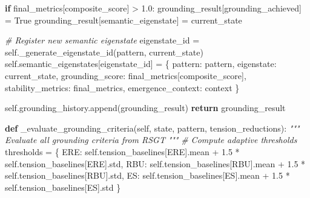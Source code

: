 \documentclass[
]{article}
\newenvironment{Shaded}{}{}
\newcommand{\CommentTok}[1]{\textcolor[rgb]{0.38,0.63,0.69}{\textit{#1}}}
\newcommand{\ControlFlowTok}[1]{\textcolor[rgb]{0.00,0.44,0.13}{\textbf{#1}}}
\newcommand{\FloatTok}[1]{\textcolor[rgb]{0.25,0.63,0.44}{#1}}
\newcommand{\KeywordTok}[1]{\textcolor[rgb]{0.00,0.44,0.13}{\textbf{#1}}}
\newcommand{\NormalTok}[1]{#1}
\newcommand{\OperatorTok}[1]{\textcolor[rgb]{0.40,0.40,0.40}{#1}}
\newcommand{\StringTok}[1]{\textcolor[rgb]{0.25,0.44,0.63}{#1}}
\newcommand{\VariableTok}[1]{\textcolor[rgb]{0.10,0.09,0.49}{#1}}
\begin{document}
\begin{Shaded}
\begin{Highlighting}[]
        \ControlFlowTok{if}\NormalTok{ final\_metrics[}\StringTok{\textquotesingle{}composite\_score\textquotesingle{}}\NormalTok{] }\OperatorTok{\textgreater{}} \FloatTok{1.0}\NormalTok{:}
\NormalTok{            grounding\_result[}\StringTok{\textquotesingle{}grounding\_achieved\textquotesingle{}}\NormalTok{] }\OperatorTok{=} \VariableTok{True}
\NormalTok{            grounding\_result[}\StringTok{\textquotesingle{}semantic\_eigenstate\textquotesingle{}}\NormalTok{] }\OperatorTok{=}\NormalTok{ current\_state}

            \CommentTok{\# Register new semantic eigenstate}
\NormalTok{            eigenstate\_id }\OperatorTok{=} \VariableTok{self}\NormalTok{.\_generate\_eigenstate\_id(pattern, current\_state)}
            \VariableTok{self}\NormalTok{.semantic\_eigenstates[eigenstate\_id] }\OperatorTok{=}\NormalTok{ \{}
                \StringTok{\textquotesingle{}pattern\textquotesingle{}}\NormalTok{: pattern,}
                \StringTok{\textquotesingle{}eigenstate\textquotesingle{}}\NormalTok{: current\_state,}
                \StringTok{\textquotesingle{}grounding\_score\textquotesingle{}}\NormalTok{: final\_metrics[}\StringTok{\textquotesingle{}composite\_score\textquotesingle{}}\NormalTok{],}
                \StringTok{\textquotesingle{}stability\_metrics\textquotesingle{}}\NormalTok{: final\_metrics,}
                \StringTok{\textquotesingle{}emergence\_context\textquotesingle{}}\NormalTok{: context}
\NormalTok{            \}}

        \VariableTok{self}\NormalTok{.grounding\_history.append(grounding\_result)}
        \ControlFlowTok{return}\NormalTok{ grounding\_result}

    \KeywordTok{def}\NormalTok{ \_evaluate\_grounding\_criteria(}\VariableTok{self}\NormalTok{, state, pattern, tension\_reductions):}
        \CommentTok{"""}
\CommentTok{        Evaluate all grounding criteria from RSGT}
\CommentTok{        """}
        \CommentTok{\# Compute adaptive thresholds}
\NormalTok{        thresholds }\OperatorTok{=}\NormalTok{ \{}
            \StringTok{\textquotesingle{}ERE\textquotesingle{}}\NormalTok{: }\VariableTok{self}\NormalTok{.tension\_baselines[}\StringTok{\textquotesingle{}ERE\textquotesingle{}}\NormalTok{].mean }\OperatorTok{+} \FloatTok{1.5} \OperatorTok{*} \VariableTok{self}\NormalTok{.tension\_baselines[}\StringTok{\textquotesingle{}ERE\textquotesingle{}}\NormalTok{].std,}
            \StringTok{\textquotesingle{}RBU\textquotesingle{}}\NormalTok{: }\VariableTok{self}\NormalTok{.tension\_baselines[}\StringTok{\textquotesingle{}RBU\textquotesingle{}}\NormalTok{].mean }\OperatorTok{+} \FloatTok{1.5} \OperatorTok{*} \VariableTok{self}\NormalTok{.tension\_baselines[}\StringTok{\textquotesingle{}RBU\textquotesingle{}}\NormalTok{].std,}
            \StringTok{\textquotesingle{}ES\textquotesingle{}}\NormalTok{: }\VariableTok{self}\NormalTok{.tension\_baselines[}\StringTok{\textquotesingle{}ES\textquotesingle{}}\NormalTok{].mean }\OperatorTok{+} \FloatTok{1.5} \OperatorTok{*} \VariableTok{self}\NormalTok{.tension\_baselines[}\StringTok{\textquotesingle{}ES\textquotesingle{}}\NormalTok{].std}
\NormalTok{        \}}


\end{Highlighting}
\end{Shaded}
\end{document}
